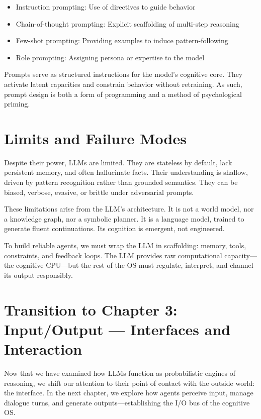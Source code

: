 \documentclass{book}
\begin{document}
\begin{itemize}
  \item Instruction prompting: Use of directives to guide behavior
  \item Chain-of-thought prompting: Explicit scaffolding of multi-step reasoning
  \item Few-shot prompting: Providing examples to induce pattern-following
  \item Role prompting: Assigning persona or expertise to the model
\end{itemize}

Prompts serve as structured instructions for the model’s cognitive core. They activate latent capacities and constrain behavior without retraining. As such, prompt design is both a form of programming and a method of psychological priming.

\section{Limits and Failure Modes}

Despite their power, LLMs are limited. They are stateless by default, lack persistent memory, and often hallucinate facts. Their understanding is shallow, driven by pattern recognition rather than grounded semantics. They can be biased, verbose, evasive, or brittle under adversarial prompts.

These limitations arise from the LLM’s architecture. It is not a world model, nor a knowledge graph, nor a symbolic planner. It is a language model, trained to generate fluent continuations. Its cognition is emergent, not engineered.

To build reliable agents, we must wrap the LLM in scaffolding: memory, tools, constraints, and feedback loops. The LLM provides raw computational capacity—the cognitive CPU—but the rest of the OS must regulate, interpret, and channel its output responsibly.

\section*{Transition to Chapter 3: Input/Output — Interfaces and Interaction}

Now that we have examined how LLMs function as probabilistic engines of reasoning, we shift our attention to their point of contact with the outside world: the interface. In the next chapter, we explore how agents perceive input, manage dialogue turns, and generate outputs—establishing the I/O bus of the cognitive OS.
\end{document}
